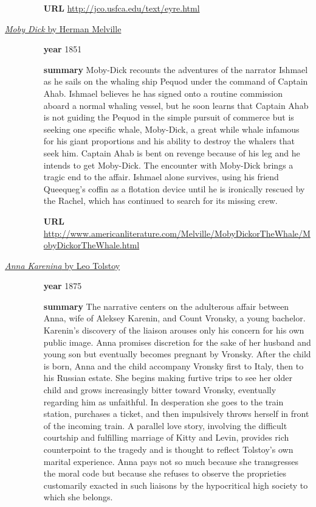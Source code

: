\documentclass[a4paper,11pt,oneside]{book}
\begin{document}
\begin{description}
\begin{itemize}
	\item [{\bf URL}] \url{http://jco.usfca.edu/text/eyre.html}
	\end{itemize} 
\item [\underline{{\it Moby Dick} by Herman Melville}]  
	\begin{itemize}
	\item [{\bf year}] 1851
	\item [{\bf summary}] Moby-Dick recounts the adventures of the narrator Ishmael as he sails on the whaling ship Pequod under the command of Captain Ahab. Ishmael believes he has signed onto a routine commission aboard a normal whaling vessel, but he soon learns that Captain Ahab is not guiding the Pequod in the simple pursuit of commerce but is seeking one specific whale, Moby-Dick, a great while whale infamous for his giant proportions and his ability to destroy the whalers that seek him. Captain Ahab is bent on revenge because of his leg and he intends to get Moby-Dick. The encounter with Moby-Dick brings a tragic end to the affair. Ishmael alone survives, using his friend Queequeg's coffin as a flotation device until he is ironically rescued by the Rachel, which has continued to search for its missing crew.
	\item [{\bf URL}] \url{http://www.americanliterature.com/Melville/MobyDickorTheWhale/MobyDickorTheWhale.html}
	\end{itemize} 
\item [\underline{{\it Anna Karenina} by Leo Tolstoy}] 
	\begin{itemize}
	\item [{\bf year}] 1875
	\item [{\bf summary}] The narrative centers on the adulterous affair between Anna, wife of Aleksey Karenin, and Count Vronsky, a young bachelor. Karenin's discovery of the liaison arouses only his concern for his own public image. Anna promises discretion for the sake of her husband and young son but eventually becomes pregnant by Vronsky. After the child is born, Anna and the child accompany Vronsky first to Italy, then to his Russian estate. She begins making furtive trips to see her older child and grows increasingly bitter toward Vronsky, eventually regarding him as unfaithful. In desperation she goes to the train station, purchases a ticket, and then impulsively throws herself in front of the incoming train. A parallel love story, involving the difficult courtship and fulfilling marriage of Kitty and Levin, provides rich counterpoint to the tragedy and is thought to reflect Tolstoy's own marital experience.  Anna pays not so much because she transgresses the moral code but because she refuses to observe the proprieties customarily exacted in such liaisons by the hypocritical high society to which she belongs.

\end{itemize}
\end{description}
\end{document}
